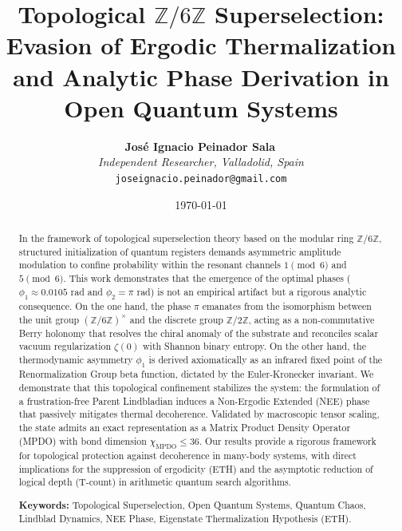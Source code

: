 \documentclass[12pt,a4paper]{article}
\theoremstyle{plain}
\theoremstyle{definition}
\theoremstyle{remark}
\begin{document}
\title{Topological $\mathbb{Z}/6\mathbb{Z}$ Superselection: Evasion of Ergodic Thermalization and Analytic Phase Derivation in Open Quantum Systems}

\author{
  \textbf{José Ignacio Peinador Sala}\, \\
  \textit{Independent Researcher, Valladolid, Spain} \\
  \texttt{joseignacio.peinador@gmail.com}
}

\date{\today}
\maketitle

\begin{abstract}
In the framework of topological superselection theory based on the modular ring $\mathbb{Z}/6\mathbb{Z}$, structured initialization of quantum registers demands asymmetric amplitude modulation to confine probability within the resonant channels $1 \pmod 6$ and $5 \pmod 6$. This work demonstrates that the emergence of the optimal phases ($\phi_1 \approx 0.0105$ rad and $\phi_2 = \pi$ rad) is not an empirical artifact but a rigorous analytic consequence. On the one hand, the phase $\pi$ emanates from the isomorphism between the unit group $(\mathbb{Z}/6\mathbb{Z})^{\times}$ and the discrete group $\mathbb{Z}/2\mathbb{Z}$, acting as a non-commutative Berry holonomy that resolves the chiral anomaly of the substrate and reconciles scalar vacuum regularization $\zeta(0)$ with Shannon binary entropy. On the other hand, the thermodynamic asymmetry $\phi_1$ is derived axiomatically as an infrared fixed point of the Renormalization Group beta function, dictated by the Euler-Kronecker invariant. We demonstrate that this topological confinement stabilizes the system: the formulation of a frustration-free Parent Lindbladian induces a Non-Ergodic Extended (NEE) phase that passively mitigates thermal decoherence. Validated by macroscopic tensor scaling, the state admits an exact representation as a Matrix Product Density Operator (MPDO) with bond dimension $\chi_{\text{MPDO}} \le 36$. Our results provide a rigorous framework for topological protection against decoherence in many-body systems, with direct implications for the suppression of ergodicity (ETH) and the asymptotic reduction of logical depth (T-count) in arithmetic quantum search algorithms.

\vspace{0.5cm}
\noindent \textbf{Keywords:} Topological Superselection, Open Quantum Systems, Quantum Chaos, Lindblad Dynamics, NEE Phase, Eigenstate Thermalization Hypothesis (ETH).
\end{abstract}
\end{document}
